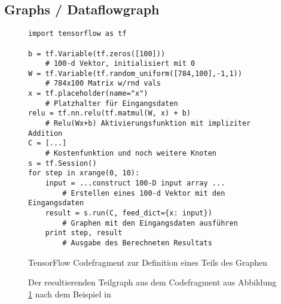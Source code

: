 \subsection{Graphs / Dataflowgraph}

\begin{figure}

\lstset{language=Python}
\begin{lstlisting}
import tensorflow as tf

b = tf.Variable(tf.zeros([100])) 
	# 100-d Vektor, initialisiert mit 0
W = tf.Variable(tf.random_uniform([784,100],-1,1)) 
	# 784x100 Matrix w/rnd vals
x = tf.placeholder(name="x") 
	# Platzhalter für Eingangsdaten
relu = tf.nn.relu(tf.matmul(W, x) + b) 
	# Relu(Wx+b) Aktivierungsfunktion mit impliziter Addition
C = [...] 
	# Kostenfunktion und noch weitere Knoten
s = tf.Session()
for step in xrange(0, 10):
	input = ...construct 100-D input array ... 
		# Erstellen eines 100-d Vektor mit den Eingangsdaten
	result = s.run(C, feed_dict={x: input}) 
		# Graphen mit den Eingangsdaten ausführen
	print step, result 
		# Ausgabe des Berechneten Resultats
\end{lstlisting}

	\caption{TensorFlow Codefragment zur Definition eines Teils des Graphen}
	\label{fig:SimpleFragmentGraphDefinition}
\end{figure}

\begin{figure}

	\centering


	\caption{Der resultierenden Teilgraph aus dem Codefragment aus Abbildung \ref{fig:SimpleFragmentGraphDefinition} nach dem Beispiel in \cite{wp2015tensorflow}}
	\label{fig:SimpleFragmentGraphPic}
\end{figure}

